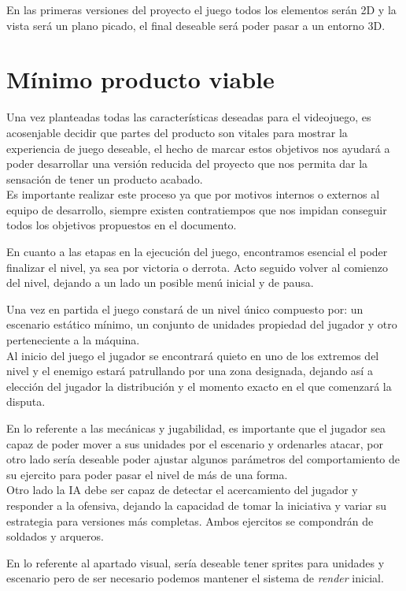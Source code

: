 En las primeras versiones del proyecto el juego todos los elementos serán 2D y la vista será
un plano picado, el final deseable será poder pasar a un entorno 3D.

\section{Mínimo producto viable}
Una vez planteadas todas las características deseadas para el videojuego, es acosenjable
decidir que partes del producto son vitales para mostrar la experiencia
de juego deseable, el hecho de marcar estos objetivos nos ayudará a poder desarrollar una
versión reducida del proyecto que nos permita dar la sensación de tener un producto acabado.\\
Es importante realizar este proceso ya que por motivos internos o externos al equipo de desarrollo,
siempre existen contratiempos que nos impidan conseguir todos los objetivos propuestos en el
documento.

En cuanto a las etapas en la ejecución del juego, encontramos esencial el poder finalizar el nivel,
ya sea por victoria o derrota. Acto seguido volver al comienzo del nivel, dejando a un lado un
posible menú inicial y de pausa.

Una vez en partida el juego constará de un nivel único compuesto por: un escenario estático
mínimo, un conjunto de unidades propiedad del jugador y otro perteneciente a la máquina.\\
Al inicio del juego el jugador se encontrará quieto en uno de los extremos del nivel y el enemigo 
estará patrullando por una zona designada, dejando así a elección del jugador la distribución y el
momento exacto en el que comenzará la disputa.

En lo referente a las mecánicas y jugabilidad, es importante que el jugador sea capaz de poder
mover a sus unidades por el escenario y ordenarles atacar, por otro lado sería deseable poder
ajustar algunos parámetros del comportamiento de su ejercito para poder pasar el nivel de más
de una forma.\\
Otro lado la \ac{IA} debe ser capaz de detectar el acercamiento del jugador y responder a la
ofensiva, dejando la capacidad de tomar la iniciativa y variar su estrategia para versiones
más completas. Ambos ejercitos se compondrán de soldados y arqueros.

En lo referente al apartado visual, sería deseable tener sprites para unidades y escenario pero
de ser necesario podemos mantener el sistema de \textit{render} inicial.
